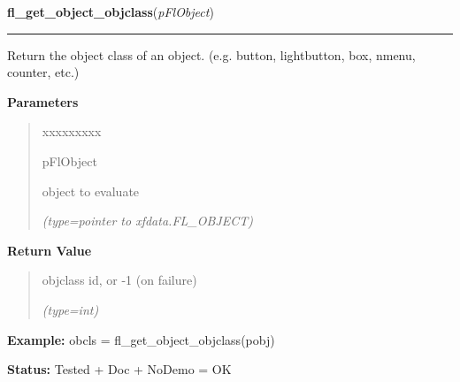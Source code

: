 \hspace{.8\funcindent}\begin{boxedminipage}{\funcwidth}

    \raggedright \textbf{fl\_get\_object\_objclass}(\textit{pFlObject})

    \vspace{-1.5ex}

    \rule{\textwidth}{0.5\fboxrule}
\setlength{\parskip}{2ex}
    Return the object class of an object. (e.g. button, lightbutton, box, 
    nmenu, counter, etc.)

\setlength{\parskip}{1ex}
      \textbf{Parameters}
      \vspace{-1ex}

      \begin{quote}
        \begin{Ventry}{xxxxxxxxx}

          \item[pFlObject]

          object to evaluate

            {\it (type=pointer to xfdata.FL\_OBJECT)}

        \end{Ventry}

      \end{quote}

      \textbf{Return Value}
    \vspace{-1ex}

      \begin{quote}
      objclass id, or -1 (on failure)

      {\it (type=int)}

      \end{quote}

\textbf{Example:} obcls = fl\_get\_object\_objclass(pobj)



\textbf{Status:} Tested + Doc + NoDemo = OK



    \end{boxedminipage}

    \label{xformslib:flbasic:fl_get_object_type}

    \vspace{0.5ex}

